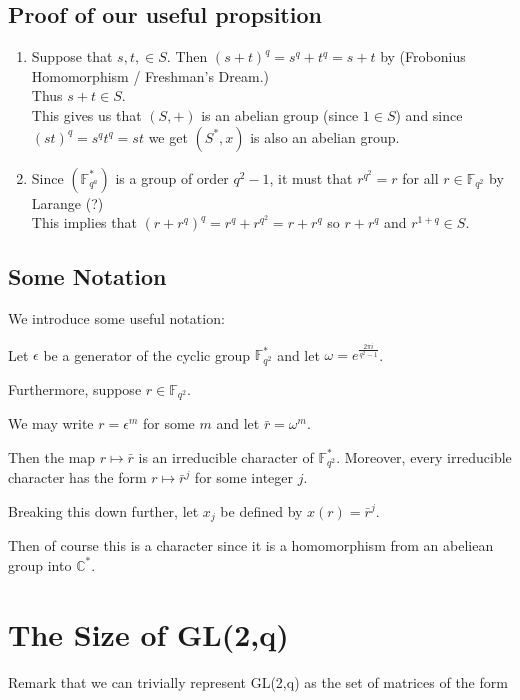 \documentclass[12pt,twoside]{reedthesis}
\begin{document}
\subsection*{Proof of our useful propsition}
\begin{enumerate}

\item Suppose that $s,t,\in{S}$.  Then ${(s+t)}^q = s^q + t^q = s+t$ by (Frobonius Homomorphism / Freshman's Dream.)
\\ Thus $s+t\in{S}$.
\\This gives us that $(S,+)$ is an abelian group (since $1\in{S}$) and since ${(st)}^q = s^qt^q = st$ we get $(S^*,x)$ is also an abelian group.
 
\item Since $(\mathbb{F}^*_{q^a})$ is a group of order $q^2 -1$, it must that $r^{q^2} = r$ for all $r\in{\mathbb{F}_{q^2}}$ by Larange (?)
\\This implies that ${(r+r^q)}^q = r^q + r^{q^2} = r + r^q$ so $r+r^q$ and $r^{1+q} \in S.$

\end{enumerate}

\subsection*{Some Notation}
We introduce some useful notation:
 
Let $\epsilon$ be a generator of the cyclic group $\mathbb{F}^*_{q^2}$ and let $\omega = e^{\frac{2\pi i}{q^2-1}}$. 

Furthermore, suppose $r\in{\mathbb{F}_{q^2}}$.

We may write $r=\epsilon^m$ for some $m$ and let $\bar{r} = \omega^m$.

Then the map $r\mapsto\bar{r}$ is an irreducible character of  $\mathbb{F}^*_{q^2}$.  Moreover, every irreducible character has the form $r\mapsto\bar{r}^j$ for some integer $j$.

Breaking this down further, let $x_j$  be defined by $x(r)=\bar{r}^j$.

Then of course this is a character since it is a homomorphism from an abeliean group into $\mathbb{C}^*.$


\section*{The Size of GL(2,q)}

Remark that we can trivially represent GL(2,q) as the set of matrices of the form
\end{document}
